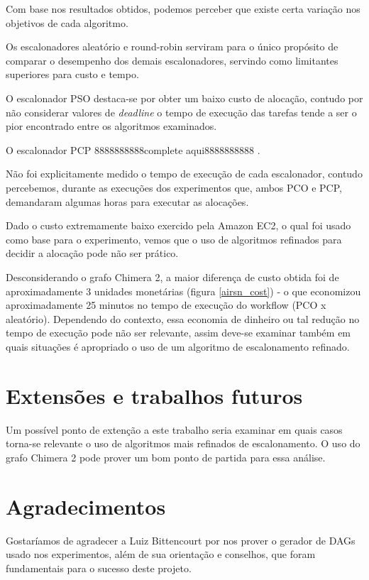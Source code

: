 \documentclass[a4paper,10pt]{article}
\begin{document}
Com base nos resultados obtidos, podemos perceber que existe certa variação nos
objetivos de cada algoritmo.

Os escalonadores aleatório e round-robin serviram para o único propósito de comparar
o desempenho dos demais escalonadores, servindo como limitantes superiores para custo
e tempo.

O escalonador PSO destaca-se por obter um baixo custo de alocação, contudo por não considerar
valores de \emph{deadline} o tempo de execução das tarefas tende a ser o pior encontrado
entre os algoritmos examinados.

O escalonador PCP   8888888888complete aqui8888888888 .

Não foi explicitamente medido o tempo de execução de cada escalonador, contudo percebemos,
durante as execuções dos experimentos que, ambos PCO e PCP, demandaram algumas horas para
executar as alocações.

Dado o custo extremamente baixo exercido pela Amazon EC2, o qual foi usado como base para
o experimento, vemos que o uso de algoritmos refinados para decidir a alocação pode não ser
prático.

Desconsiderando o grafo Chimera 2, a maior diferença de custo obtida foi de aproximadamente
3 unidades monetárias (figura \ref{airsn_cost}) - o que economizou aproximadamente
25 minutos no tempo de execução do workflow (PCO x aleatório).
Dependendo do contexto, essa economia de dinheiro ou tal redução no tempo de execução pode não
ser relevante, assim deve-se examinar também em quais situações é apropriado o uso de um algoritmo
de escalonamento refinado.

\section{Extensões e trabalhos futuros}

Um possível ponto de extenção a este trabalho seria examinar em quais casos torna-se relevante o uso
de algoritmos mais refinados de escalonamento. O uso do grafo Chimera 2 pode prover um bom ponto de
partida para essa análise.

\section{Agradecimentos}

Gostaríamos de agradecer a Luiz Bittencourt por nos
prover o gerador de DAGs usado nos experimentos, além de sua orientação e
conselhos, que foram fundamentais para o sucesso deste projeto.
\end{document}
